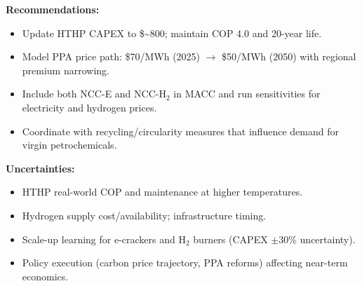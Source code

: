 \documentclass[11pt]{article}
\begin{document}
\textbf{Recommendations:}
\begin{itemize}
    \item Update HTHP CAPEX to \${\sim}800; maintain COP 4.0 and 20-year life.
    \item Model PPA price path: \$70/MWh (2025) $\rightarrow$ \$50/MWh (2050) with regional premium narrowing.
    \item Include both NCC-E and NCC-H$_2$ in MACC and run sensitivities for electricity and hydrogen prices.
    \item Coordinate with recycling/circularity measures that influence demand for virgin petrochemicals.
\end{itemize}

\textbf{Uncertainties:}
\begin{itemize}
    \item HTHP real-world COP and maintenance at higher temperatures.
    \item Hydrogen supply cost/availability; infrastructure timing.
    \item Scale-up learning for e-crackers and H$_2$ burners (CAPEX $\pm$30\% uncertainty).
    \item Policy execution (carbon price trajectory, PPA reforms) affecting near-term economics.
\end{itemize}



\end{document}
